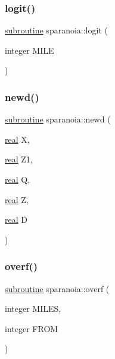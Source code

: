 \subsubsection{\texorpdfstring{logit()}{logit()}}
{\footnotesize\ttfamily \hyperlink{M__stopwatch_83_8txt_acfbcff50169d691ff02d4a123ed70482}{subroutine} sparanoia\+::logit (\begin{DoxyParamCaption}\item[{integer}]{M\+I\+LE }\end{DoxyParamCaption})}

\mbox{\label{sparanoia_8f90_a1a7c7f32e1cdfae6821cd45ce4579c29}} 
\subsubsection{\texorpdfstring{newd()}{newd()}}
{\footnotesize\ttfamily \hyperlink{M__stopwatch_83_8txt_acfbcff50169d691ff02d4a123ed70482}{subroutine} sparanoia\+::newd (\begin{DoxyParamCaption}\item[{\hyperlink{read__watch_83_8txt_abdb62bde002f38ef75f810d3a905a823}{real}}]{X,  }\item[{\hyperlink{read__watch_83_8txt_abdb62bde002f38ef75f810d3a905a823}{real}}]{Z1,  }\item[{\hyperlink{read__watch_83_8txt_abdb62bde002f38ef75f810d3a905a823}{real}}]{Q,  }\item[{\hyperlink{read__watch_83_8txt_abdb62bde002f38ef75f810d3a905a823}{real}}]{Z,  }\item[{\hyperlink{read__watch_83_8txt_abdb62bde002f38ef75f810d3a905a823}{real}}]{D }\end{DoxyParamCaption})}

\mbox{\label{sparanoia_8f90_a38d9bdfaf7f831fbe65011a823b5b39d}} 
\subsubsection{\texorpdfstring{overf()}{overf()}}
{\footnotesize\ttfamily \hyperlink{M__stopwatch_83_8txt_acfbcff50169d691ff02d4a123ed70482}{subroutine} sparanoia\+::overf (\begin{DoxyParamCaption}\item[{integer}]{M\+I\+L\+ES,  }\item[{integer}]{F\+R\+OM }\end{DoxyParamCaption})}



